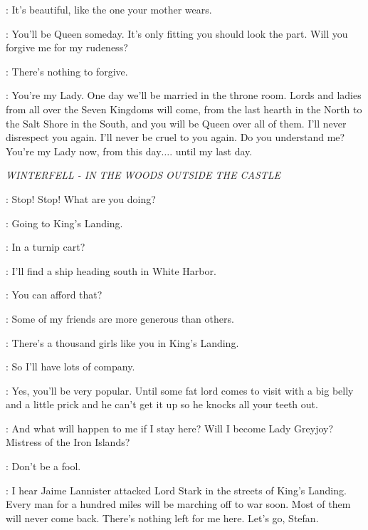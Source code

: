 \SANSA:  It's beautiful, like the one your mother wears. 

\JOFFREY:  You'll be Queen someday. It's only fitting you should look the part.  Will you forgive me for my rudeness? 

\SANSA:  There's nothing to forgive. 

\JOFFREY:  You're my Lady. One day we'll be married in the throne room.  Lords and ladies from all over the Seven Kingdoms will come, from the last hearth in the North to the Salt Shore in the South, and you will be Queen over all of them.  I'll never disrespect you again. I'll never be cruel to you again. Do you understand me? You're my Lady now, from this day$\ldots$. until my last day. 


\scene

\textit{WINTERFELL - IN THE WOODS OUTSIDE THE CASTLE} 


\THEON:  Stop! Stop!  What are you doing? 

\ROS:  Going to King's Landing. 

\THEON:  In a turnip cart? 

\ROS:  I'll find a ship heading south in White Harbor. 

\THEON:  You can afford that? 

\ROS:  Some of my friends are more generous than others. 

\THEON:  There's a thousand girls like you in King's Landing. 

\ROS:  So I'll have lots of company. 

\THEON:  Yes, you'll be very popular. Until some fat lord comes to visit with a big belly and a little prick and he can't get it up so he knocks all your teeth out. 

\ROS:  And what will happen to me if I stay here? Will I become Lady Greyjoy? Mistress of the Iron Islands? 

\THEON:  Don't be a fool. 

\ROS:  I hear Jaime Lannister attacked Lord Stark in the streets of King's Landing. Every man for a hundred miles will be marching off to war soon. Most of them will never come back. There's nothing left for me here.  Let's go, Stefan. 


